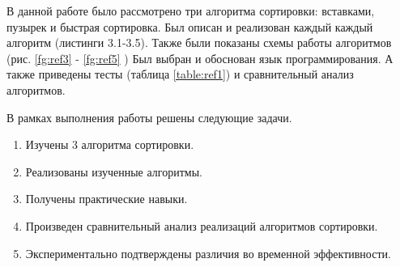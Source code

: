 \Conclusion %

В данной работе было рассмотрено три алгоритма сортировки: вставками, пузырек и быстрая сортировка.
Был описан и реализован каждый каждый алгоритм (листинги 3.1-3.5). 
Также были показаны схемы работы алгоритмов (рис. \ref{fg:ref3} - \ref{fg:ref5} ) 
Был выбран и обоснован язык программирования. 
А также приведены тесты (таблица \ref{table:ref1})
и сравнительный анализ алгоритмов.


В рамках выполнения работы решены следующие задачи.

\begin{enumerate}
	\item Изучены 3 алгоритма сортировки.
	\item Реализованы изученные алгоритмы.
	\item Получены практические навыки.
	\item Произведен сравнительный анализ реализаций алгоритмов сортировки.
	\item Экспериментально подтверждены различия во временной эффективности.
\end{enumerate}